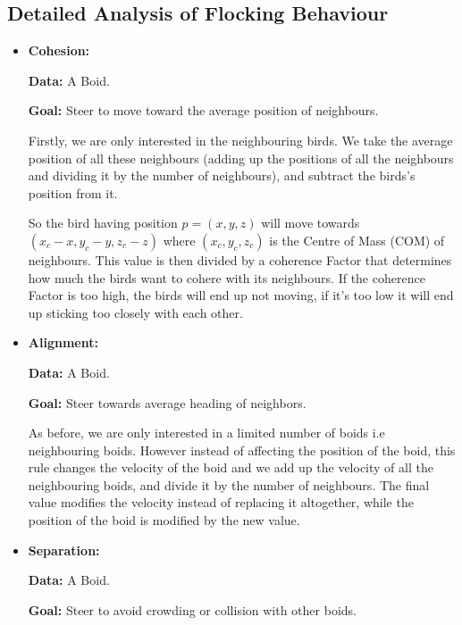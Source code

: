 \documentclass[12pt]{article}
\begin{document}
\subsection{Detailed Analysis of Flocking Behaviour}

\begin{itemize}
    \item \textbf{Cohesion:}
    
    \textbf{Data:} A Boid.    
    
    \textbf{Goal:} Steer to move toward the average position of neighbours.
    
    \bigskip
    
    Firstly, we are only interested in the neighbouring birds. We take the average position of all these neighbours (adding up the positions of all the neighbours and dividing it by the number of neighbours), and subtract the birds's position from it. 
    
    So the bird having position $p = (x,y,z)$ will move towards $(x_c-x,y_c-y,z_c-z)$ where $(x_c,y_c,z_c)$ is the Centre of Mass (COM) of neighbours. This value is then divided by a coherence Factor that determines how much the birds want to cohere with its neighbours. If the coherence Factor is too high, the birds will end up not moving, if it's too low it will end up sticking too closely with each other.

    \item \textbf{Alignment:}
    
    \textbf{Data:} A Boid.    
    
    \textbf{Goal:} Steer towards average heading of neighbors.
    
    \bigskip
    
        As before, we are only interested in a limited number of boids i.e neighbouring boids. However instead of affecting the position of the boid, this rule changes the velocity of the boid and we add up the velocity of all the neighbouring boids, and divide it by the number of neighbours. The final value modifies the velocity instead of replacing it altogether, while the position of the boid is modified by the new value.
        
    \item \textbf{Separation:}
    
    \textbf{Data:} A Boid.    
    
    \textbf{Goal:} Steer to avoid crowding or collision with other boids.
    
    \bigskip
    

\end{itemize}
\end{document}
